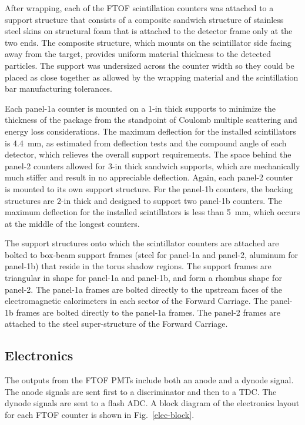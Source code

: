 \documentclass{elsart}
\begin{document}
After wrapping, each of the FTOF scintillation counters was attached to a support structure that consists
of a composite sandwich structure of stainless steel skins on structural foam that is attached to the
detector frame only at the two ends. The composite structure, which mounts on the scintillator side facing
away from the target, provides uniform material thickness to the detected particles.  The support was
undersized across the counter width so they could be placed as close together as allowed by the wrapping
material and the scintillation bar manufacturing tolerances. 

Each panel-1a counter is mounted on a 1-in thick supports to minimize the thickness of the package from
the standpoint of Coulomb multiple scattering and energy loss considerations.  The maximum deflection
for the installed scintillators is 4.4~mm, as estimated from deflection tests and the compound angle of
each detector, which relieves the overall support requirements. The space behind the panel-2 counters
allowed for 3-in thick sandwich supports, which are mechanically much stiffer and result in no appreciable
deflection. Again, each panel-2 counter is mounted to its own support structure. For the panel-1b counters,
the backing structures are 2-in thick and designed to support two panel-1b counters. The maximum
deflection for the installed scintillators is less than 5~mm, which occurs at the middle of the longest
counters.

The support structures onto which the scintillator counters are attached are bolted to box-beam support
frames (steel for panel-1a and panel-2, aluminum for panel-1b) that reside in the torus shadow regions.
The support frames are triangular in shape for panel-1a and panel-1b, and form a rhombus shape for
panel-2. The panel-1a frames are bolted directly to the upstream faces of the electromagnetic
calorimeters in each sector of the Forward Carriage. The panel-1b frames are bolted directly to the
panel-1a frames. The panel-2 frames are attached to the steel super-structure of the Forward Carriage.

\subsection{Electronics}
\label{sec-elec}

The outputs from the FTOF PMTs include both an anode and a dynode signal. The anode signals are
sent first to a discriminator and then to a TDC. The dynode signals are sent to a flash ADC. A block
diagram of the electronics layout for each FTOF counter is shown in Fig.~\ref{elec-block}.
\end{document}

